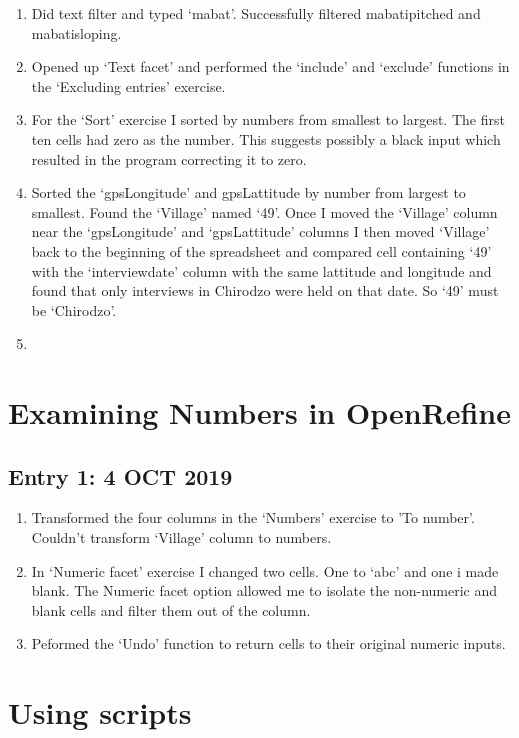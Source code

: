 \documentclass{article}
\begin{document}
\begin{enumerate}
    \item Did text filter and typed `mabat'. Successfully filtered mabatipitched and mabatisloping.
    \item Opened up `Text facet' and performed the `include' and `exclude' functions in the `Excluding entries' exercise.
    \item For the `Sort' exercise I sorted by numbers from smallest to largest. The first ten cells had zero as the number. This suggests possibly a black input which resulted in the program correcting it to zero.
    \item Sorted the `gps\textunderscore Longitude' and gps\textunderscore Lattitude by number from largest to smallest. Found the `Village' named `49'. Once I moved the `Village' column near the `gps\textunderscore Longitude' and `gps\textunderscore Lattitude' columns I then moved `Village' back to the beginning of the spreadsheet and compared cell containing `49' with the `interview\textunderscore date' column with the same lattitude and longitude and found that only interviews in Chirodzo were held on that date. So `49' must be `Chirodzo'.
    \item 
\end{enumerate}

\section{Examining Numbers in OpenRefine}

\subsection{Entry 1: 4 OCT 2019}

\begin{enumerate}
    \item Transformed the four columns in the `Numbers' exercise to 'To number'. Couldn't transform `Village' column to numbers.
    \item In `Numeric facet' exercise I changed two cells. One to `abc' and one i made blank. The Numeric facet option allowed me to isolate the non-numeric and blank cells and filter them out of the column.
    \item Peformed the `Undo' function to return cells to their original numeric inputs.
\end{enumerate}

\section{Using scripts}
\end{document}
